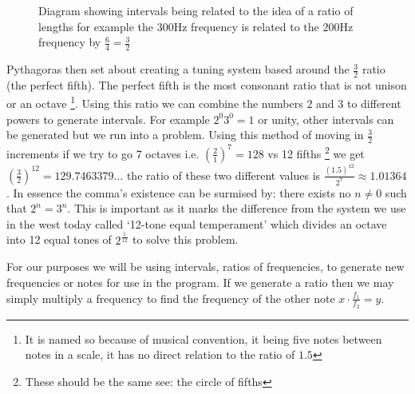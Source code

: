 \begin{figure}[H]
    \centering
    \caption{Diagram showing intervals being related to the idea of a ratio of
    lengths for example the $300\si{\hertz}$ frequency is related to the
    $200\si{\hertz}$ frequency by $\frac{6}{4} = \frac{3}{2}$}
\end{figure}

Pythagoras then set about creating a tuning system based around the
$\frac{3}{2}$ ratio (the perfect fifth). The perfect fifth is the most consonant
ratio that is not unison or an octave \footnote{It is named so because of
musical convention, it being five notes between notes in a scale, it has no
direct relation to the ratio of $1.5$}. Using this ratio we can combine the
numbers $2$ and $3$ to different powers to generate intervals. For example $2^0
3^0 = 1$ or unity, other intervals can be generated but we run into a problem.
Using this method of moving in $\frac{3}{2}$ increments if we try to go 7
octaves i.e.  $(\frac{2}{1})^7 = 128$ vs 12 fifths \footnote{These should be the
same see: the circle of fifths} we get $(\frac{3}{2})^{12} =
129.7463379\ldots$ the ratio of these two different values is
$\frac{(1.5)^{12}}{2^7} \approx 1.01364$. In essence the comma's existence can
be surmised by: there exists no $n \neq 0$ such that $2^n = 3^n$. This is
important as it marks the difference from the system we use in the west today
called `12-tone equal temperament' which divides an octave into 12 equal tones
of $2^{\frac{1}{12}}$ to solve this problem.

For our purposes we will be using intervals, ratios of frequencies, to generate
new frequencies or notes for use in the program. If we generate a ratio then we
may simply multiply a frequency to find the frequency of the other note $x \cdot
\frac{f_1}{f_2} = y$.

